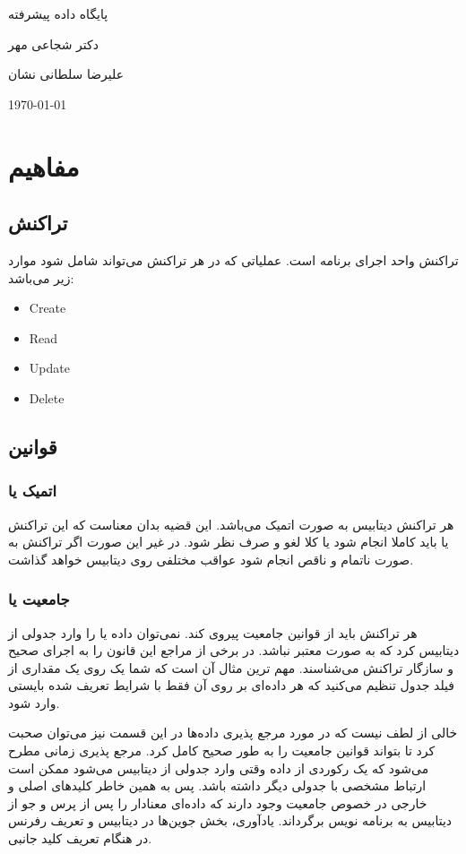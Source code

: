 \documentclass[20pt, a4paper]{article}
\begin{document}
\centerline{پایگاه داده پیشرفته}
\centerline{دکتر شجاعی مهر}
\centerline{علیرضا سلطانی نشان}
\centerline{\today}

\tableofcontents

\newpage

\section{مفاهیم}

\subsection{تراکنش}

تراکنش واحد اجرای برنامه است. عملیاتی که در هر تراکنش می‌تواند شامل شود موارد
زیر می‌باشد:

\begin{itemize}
    \item Create
    \item Read
    \item Update
    \item Delete
\end{itemize}

\subsection{قوانین }

\subsubsection{اتمیک یا }

هر تراکنش دیتابیس به صورت اتمیک می‌باشد. این قضیه بدان معناست که این تراکنش یا
باید کاملا انجام شود یا کلا لغو و صرف نظر شود. در غیر این صورت اگر تراکنش به
صورت ناتمام و ناقص انجام شود عواقب مختلفی روی دیتابیس خواهد گذاشت.

\subsubsection{جامعیت یا }

هر تراکنش باید از قوانین جامعیت پیروی کند. نمی‌توان داده یا را وارد جدولی از
دیتابیس کرد که به صورت معتبر نباشد. در برخی از مراجع این قانون را به اجرای صحیح
و سازگار تراکنش می‌شناسند. مهم ترین مثال آن است که شما یک  روی یک
مقداری از فیلد جدول تنظیم می‌کنید که هر داده‌ای بر روی آن فقط با شرایط تعریف شده
بایستی وارد شود.

خالی از لطف نیست که در مورد مرجع پذیری داده‌ها در این قسمت نیز می‌توان صحبت کرد
تا بتواند قوانین جامعیت را به طور صحیح کامل کرد. مرجع پذیری زمانی مطرح می‌شود که
یک رکوردی از داده وقتی وارد جدولی از دیتابیس می‌شود ممکن است ارتباط مشخصی با
جدولی دیگر داشته باشد. پس به همین خاطر کلید‌های اصلی و خارجی در خصوص جامعیت وجود
دارند که داده‌ای معنادار را پس از پرس و جو از دیتابیس به برنامه نویس برگرداند.
یادآوری، بخش جوین‌ها در دیتابیس و تعریف رفرنس در هنگام تعریف کلید جانبی.
\end{document}
